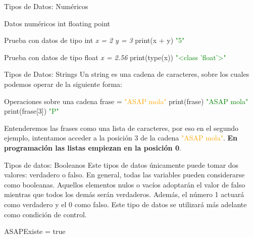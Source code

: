 \documentclass{beamer}
\begin{document}
    \begin{frame} {Tipos de Datos: Numéricos}
    \label{datos:numericos}
		\begin{block}{Datos numéricos}
			int
			floating point
		\end{block}
		\begin{Programexample}{Prueba con datos de tipo int}
			\centering
			\textit{x = 2}
			\textit{y = 3}
			print(x + y)
			\textcolor{green}{"5"}
		\end{Programexample}
    	\begin{Programexample}{Prueba con datos de tipo float}
    		\centering\textit{x = 2.56}
		    print(type(x))
		     \textcolor{green}{"<class 'float'>"}
    	\end{Programexample}
    \end{frame}
    
    \begin{frame} {Tipos de Datos: Strings}
        \label{datos:strings}
        Un string es una cadena de caracteres, sobre los cuales podemos operar de la siguiente forma:
        \begin{Programexample} {Operaciones sobre una cadena}
        	frase = \textcolor{orange}{"ASAP mola"}
        	print(frase) \hspace{3cm} \textcolor{green}{"ASAP mola"}
        	print(frase[3])\hspace{2.7cm} \textcolor{green}{"P"}
	    \end{Programexample}
    	Entenderemos las frases como una lista de caracteres, por eso en el segundo ejemplo, intentamos acceder a la posición 3 de la cadena  \textcolor{orange}{"ASAP mola"}.
    	\textbf{En programación las listas empiezan en la posición 0}.
    \end{frame}
        
    \begin{frame}{Tipos de datos: Booleanos}
        Este tipos de datos únicamente puede tomar dos valores: verdadero o falso. En general, todas las variables pueden considerarse como booleanas. Aquellos elementos nulos o vacíos adoptarán el valor de falso mientras que todos los demás serán verdaderos. Además, el número 1 actuará como verdadero y el 0 como falso.
        Este tipo de datos se utilizará más adelante como condición de control.
        \begin{Programexample}
        	\centering ASAPExiste = true
        \end{Programexample}
	\end{frame}
	
\end{document}
